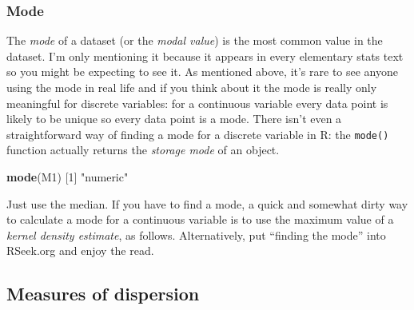 \documentclass[
]{book}
\newenvironment{Shaded}{\begin{snugshade}}{\end{snugshade}}
\newcommand{\CommentTok}[1]{\textcolor[rgb]{0.56,0.35,0.01}{\textit{#1}}}
\newcommand{\DecValTok}[1]{\textcolor[rgb]{0.00,0.00,0.81}{#1}}
\newcommand{\FloatTok}[1]{\textcolor[rgb]{0.00,0.00,0.81}{#1}}
\newcommand{\KeywordTok}[1]{\textcolor[rgb]{0.13,0.29,0.53}{\textbf{#1}}}
\newcommand{\NormalTok}[1]{#1}
\newcommand{\OperatorTok}[1]{\textcolor[rgb]{0.81,0.36,0.00}{\textbf{#1}}}
\newcommand{\StringTok}[1]{\textcolor[rgb]{0.31,0.60,0.02}{#1}}
\begin{document}
\hypertarget{mode}{%
\subsubsection{Mode}\label{mode}}

The \emph{mode} of a dataset (or the \emph{modal value}) is the most common value in the dataset. I'm only mentioning it because it appears in every elementary stats text so you might be expecting to see it. As mentioned above, it's rare to see anyone using the mode in real life and if you think about it the mode is really only meaningful for discrete variables: for a continuous variable every data point is likely to be unique so every data point is a mode. There isn't even a straightforward way of finding a mode for a discrete variable in R: the \texttt{mode()} function actually returns the \emph{storage mode} of an object.

\begin{Shaded}
\begin{Highlighting}[]
\KeywordTok{mode}\NormalTok{(M1)}
\NormalTok{[}\DecValTok{1}\NormalTok{] }\StringTok{"numeric"}
\end{Highlighting}
\end{Shaded}

Just use the median. If you have to find a mode, a quick and somewhat dirty way to calculate a mode for a continuous variable is to use the maximum value of a \emph{kernel density estimate}, as follows. Alternatively, put ``finding the mode'' into RSeek.org and enjoy the read.

\begin{Shaded}
\end{Shaded}

\hypertarget{measures-of-dispersion}{%
\subsection{Measures of dispersion}\label{measures-of-dispersion}}
\end{document}
